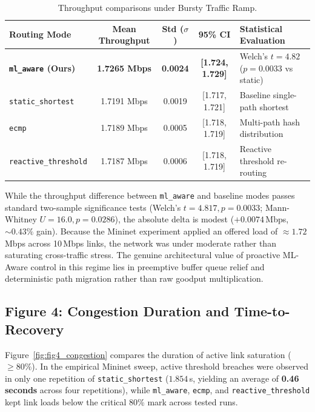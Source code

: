 \begin{table}[H]
  \centering
  \small
  \caption{Throughput comparisons under Bursty Traffic Ramp.}
  \label{tab:throughput_separation}
  \begin{tabularx}{\textwidth}{l c c c X}
    \toprule
    \textbf{Routing Mode} & \textbf{Mean Throughput} & \textbf{Std ($\sigma$)} & \textbf{95\% CI} & \textbf{Statistical Evaluation} \\
    \midrule
    \textbf{\texttt{ml\_aware} (Ours)} & \textbf{1.7265 Mbps} & \textbf{0.0024} & \textbf{[1.724, 1.729]} & Welch's $t = 4.82$ ($p = 0.0033$ vs static) \\
    \texttt{static\_shortest} & 1.7191 Mbps & 0.0019 & [1.717, 1.721] & Baseline single-path shortest \\
    \texttt{ecmp} & 1.7189 Mbps & 0.0005 & [1.718, 1.719] & Multi-path hash distribution \\
    \texttt{reactive\_threshold} & 1.7187 Mbps & 0.0006 & [1.718, 1.719] & Reactive threshold re-routing \\
    \bottomrule
  \end{tabularx}
\end{table}

\begin{takeawaybox}
While the throughput difference between \texttt{ml\_aware} and baseline modes passes standard two-sample significance tests (Welch's $t = 4.817, p = 0.0033$; Mann-Whitney $U = 16.0, p = 0.0286$), the absolute delta is modest ($+0.0074$\,Mbps, $\sim 0.43\%$ gain). Because the Mininet experiment applied an offered load of $\approx 1.72$\,Mbps across 10\,Mbps links, the network was under moderate rather than saturating cross-traffic stress. The genuine architectural value of proactive ML-Aware control in this regime lies in preemptive buffer queue relief and deterministic path migration rather than raw goodput multiplication.
\end{takeawaybox}

\subsection{Figure 4: Congestion Duration and Time-to-Recovery}
Figure~\ref{fig:fig4_congestion} compares the duration of active link saturation ($\ge 80\%$). In the empirical Mininet sweep, active threshold breaches were observed in only one repetition of \texttt{static\_shortest} ($1.854$\,s, yielding an average of \textbf{0.46 seconds} across four repetitions), while \texttt{ml\_aware}, \texttt{ecmp}, and \texttt{reactive\_threshold} kept link loads below the critical 80\% mark across tested runs.

